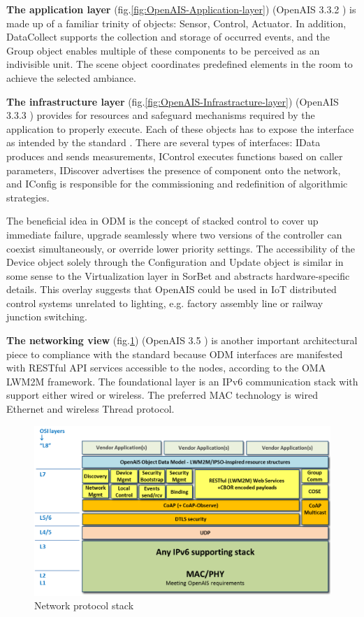 \documentclass[11pt, english, a4paper, twoside]{article}
\begin{document}
\textbf{The application layer} (fig.\ref{fig:OpenAIS-Application-layer}) (OpenAIS 3.3.2 \cite{openais}) is made up of a familiar trinity of objects: Sensor, Control, Actuator. In addition, DataCollect supports the collection and storage of occurred events, and the Group object enables multiple of these components to be perceived as an indivisible unit. The scene object coordinates predefined elements in the room to achieve the selected ambiance. 

\textbf{The infrastructure layer} (fig.\ref{fig:OpenAIS-Infrastracture-layer}) (OpenAIS 3.3.3 \cite{openais}) provides for resources and safeguard mechanisms required by the application to properly execute. Each of these objects has to expose the interface as intended by the standard \cite{openais}. There are several types of interfaces: IData produces and sends measurements, IControl executes functions based on caller parameters, IDiscover advertises the presence of component onto the network, and IConfig is responsible for the commissioning and redefinition of algorithmic strategies.

The beneficial idea in ODM is the concept of stacked control to cover up immediate failure, upgrade seamlessly where two versions of the controller can coexist simultaneously, or override lower priority settings. The accessibility of the Device object solely through the Configuration and Update object is similar in some sense to the Virtualization layer in SorBet and abstracts hardware-specific details. This overlay suggests that OpenAIS could be used in IoT distributed control systems unrelated to lighting, e.g. factory assembly line or railway junction switching.

\textbf{The networking view} (fig.\ref{fig:network-stack}) (OpenAIS 3.5 \cite{openais}) is another important architectural piece to compliance with the standard because ODM interfaces are manifested with RESTful API services accessible to the nodes, according to the OMA LWM2M framework. The foundational layer is an IPv6 communication stack with support either wired or wireless. The preferred MAC technology is wired Ethernet and wireless Thread protocol.

\begin{figure}
	\centering
	\includegraphics[width=\textwidth]{Network-stack-s-81.png}
	\caption{Network protocol stack}
	\label{fig:network-stack}
\end{figure}
\end{document}
